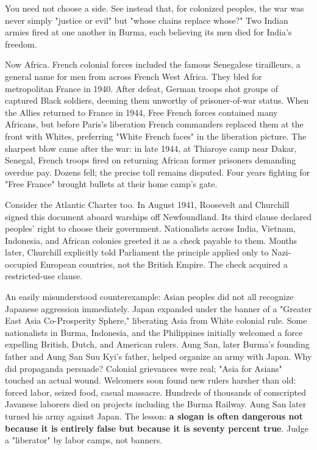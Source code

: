 You need not choose a side. See instead that, for colonized peoples, the war was never simply "justice or evil" but "whose chains replace whose?" Two Indian armies fired at one another in Burma, each believing its men died for India's freedom.

Now Africa. French colonial forces included the famous Senegalese tirailleurs, a general name for men from across French West Africa. They bled for metropolitan France in 1940. After defeat, German troops shot groups of captured Black soldiers, deeming them unworthy of prisoner-of-war status. When the Allies returned to France in 1944, Free French forces contained many Africans, but before Paris's liberation French commanders replaced them at the front with Whites, preferring "White French faces" in the liberation picture. The sharpest blow came after the war: in late 1944, at Thiaroye camp near Dakar, Senegal, French troops fired on returning African former prisoners demanding overdue pay. Dozens fell; the precise toll remains disputed. Four years fighting for "Free France" brought bullets at their home camp's gate.

Consider the Atlantic Charter too. In August 1941, Roosevelt and Churchill signed this document aboard warships off Newfoundland. Its third clause declared peoples' right to choose their government. Nationalists across India, Vietnam, Indonesia, and African colonies greeted it as a check payable to them. Months later, Churchill explicitly told Parliament the principle applied only to Nazi-occupied European countries, not the British Empire. The check acquired a restricted-use clause.

An easily misunderstood counterexample: Asian peoples did not all recognize Japanese aggression immediately. Japan expanded under the banner of a "Greater East Asia Co-Prosperity Sphere," liberating Asia from White colonial rule. Some nationalists in Burma, Indonesia, and the Philippines initially welcomed a force expelling British, Dutch, and American rulers. Aung San, later Burma's founding father and Aung San Suu Kyi's father, helped organize an army with Japan. Why did propaganda persuade? Colonial grievances were real; "Asia for Asians" touched an actual wound. Welcomers soon found new rulers harsher than old: forced labor, seized food, casual massacre. Hundreds of thousands of conscripted Javanese laborers died on projects including the Burma Railway. Aung San later turned his army against Japan. The lesson: \textbf{a slogan is often dangerous not because it is entirely false but because it is seventy percent true}. Judge a "liberator" by labor camps, not banners.


